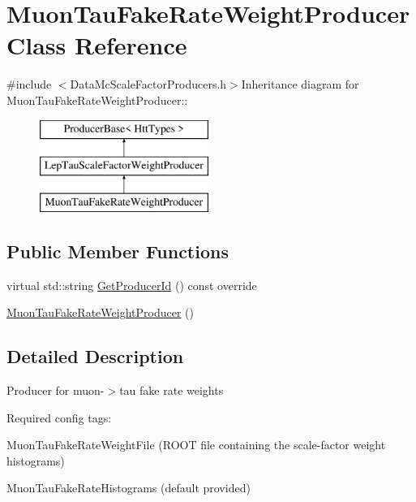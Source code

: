 \hypertarget{classMuonTauFakeRateWeightProducer}{
\section{MuonTauFakeRateWeightProducer Class Reference}
\label{classMuonTauFakeRateWeightProducer}
}


{\ttfamily \#include $<$DataMcScaleFactorProducers.h$>$}Inheritance diagram for MuonTauFakeRateWeightProducer::\begin{figure}[H]
\begin{center}
\leavevmode
\includegraphics[height=3cm]{classMuonTauFakeRateWeightProducer}
\end{center}
\end{figure}
\subsection*{Public Member Functions}
\begin{DoxyCompactItemize}
\item 
virtual std::string \hyperlink{classMuonTauFakeRateWeightProducer_ae094152bca1c98c2508ce761e7b2dcbe}{GetProducerId} () const override
\item 
\hyperlink{classMuonTauFakeRateWeightProducer_a5ec8fe08d3c322ec95e5c94f58623654}{MuonTauFakeRateWeightProducer} ()
\end{DoxyCompactItemize}


\subsection{Detailed Description}
Producer for muon-\/$>$tau fake rate weights

Required config tags:
\begin{DoxyItemize}
\item MuonTauFakeRateWeightFile (ROOT file containing the scale-\/factor weight histograms)
\item MuonTauFakeRateHistograms (default provided) 
\end{DoxyItemize}


